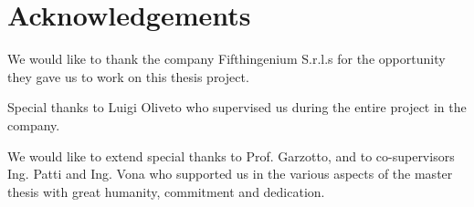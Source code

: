 \chapter{Acknowledgements}

We would like to thank the company Fifthingenium S.r.l.s for the opportunity they gave us to work on this thesis project. 

Special thanks to Luigi Oliveto who supervised us during the entire project in the company. 

We would like to extend special thanks to Prof. Garzotto, and to co-supervisors Ing. Patti and Ing. Vona who supported us in the various aspects of the master thesis with great humanity, commitment and dedication.